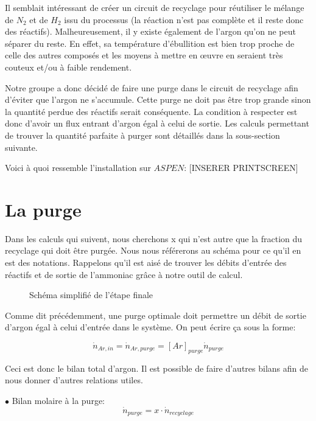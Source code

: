 \documentclass[a4paper, oneside, 12pt]{article}
\begin{document}
Il semblait intéressant de créer un circuit de recyclage pour réutiliser 
le mélange de $N_2$ et de $H_2$ issu du processus (la réaction n'est pas complète 
et il reste donc des réactifs). 
Malheureusement, il y existe également de l'argon qu'on ne peut séparer du reste. 
En effet, sa température d'ébullition est bien trop proche de celle des autres composés et 
les moyens à mettre en œuvre en seraient très couteux et/ou à faible rendement. 

Notre groupe a donc décidé de faire une purge dans le circuit de recyclage 
afin d'éviter que l'argon ne s'accumule. Cette purge ne doit pas être trop grande 
sinon la quantité perdue des réactifs serait conséquente. 
La condition à respecter est donc d'avoir un flux entrant d'argon égal à celui de sortie. 
Les calculs permettant de trouver la quantité parfaite à purger 
sont détaillés dans la sous-section suivante.

Voici à quoi ressemble l'installation sur $ASPEN$:
[INSERER PRINTSCREEN]

\section{La purge}

Dans les calculs qui suivent, nous cherchons x qui n'est autre que la fraction du recyclage 
qui doit être purgée. Nous nous référerons au schéma pour ce qu'il en est des notations. 
Rappelons qu'il est aisé de trouver les débits d'entrée des réactifs 
et de sortie de l'ammoniac grâce à notre outil de calcul.

\begin{figure}[h!]
	\begin{center}
		
	\end{center}
	\caption{Schéma simplifié de l'étape finale}
	\label{fig:schema}
\end{figure}


Comme dit précédemment, une purge optimale doit permettre un débit 
de sortie d'argon égal à celui d'entrée dans le système. 
On peut écrire ça sous la forme:

\begin{equation}
\dot{n}_{Ar,in}=\dot{n}_{Ar,purge}=[Ar]_{purge} \dot{n}_{purge}
\end{equation}

Ceci est donc le bilan total d'argon. 
Il est possible de faire d'autres bilans afin de nous donner d'autres relations utiles.

$\bullet$ Bilan molaire à la purge:
\begin{equation}
\dot{n}_{purge} = x \cdot \dot{n}_{recyclage}
\label{eq:bilan_mol_purge}
\end{equation}
\end{document}
